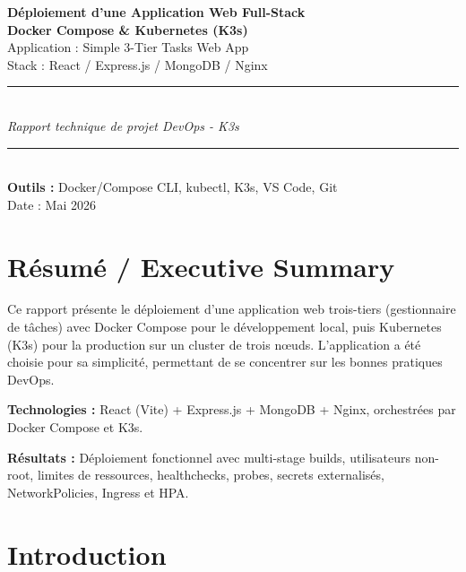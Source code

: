 \documentclass[12pt,a4paper]{report}
\begin{document}
\begin{titlepage}
\centering
\vspace*{2cm}
{\Huge\bfseries Déploiement d'une Application Web Full-Stack}\\[0.5cm]
{\LARGE\bfseries Docker Compose \& Kubernetes (K3s)}\\[2cm]
{\Large Application : Simple 3-Tier Tasks Web App}\\[0.3cm]
{\large Stack : React / Express.js / MongoDB / Nginx}\\[3cm]
\rule{\textwidth}{1pt}\\[0.5cm]
{\large\itshape Rapport technique de projet DevOps - K3s}\\[0.5cm]
\rule{\textwidth}{1pt}\\[3cm]
{\large\textbf{Outils :}} Docker/Compose CLI, kubectl, K3s, VS Code, Git\\[2cm]
{\large Date : Mai 2026}
\vfill
\end{titlepage}

\tableofcontents
\clearpage

\chapter*{Résumé / Executive Summary}

Ce rapport présente le déploiement d'une application web trois-tiers (gestionnaire de tâches) avec Docker Compose pour le développement local, puis Kubernetes (K3s) pour la production sur un cluster de trois nœuds. L'application a été choisie pour sa simplicité, permettant de se concentrer sur les bonnes pratiques DevOps.

\textbf{Technologies :} React (Vite) + Express.js + MongoDB + Nginx, orchestrées par Docker Compose et K3s.

\textbf{Résultats :} Déploiement fonctionnel avec multi-stage builds, utilisateurs non-root, limites de ressources, healthchecks, probes, secrets externalisés, NetworkPolicies, Ingress et HPA.

\chapter{Introduction}
\end{document}
